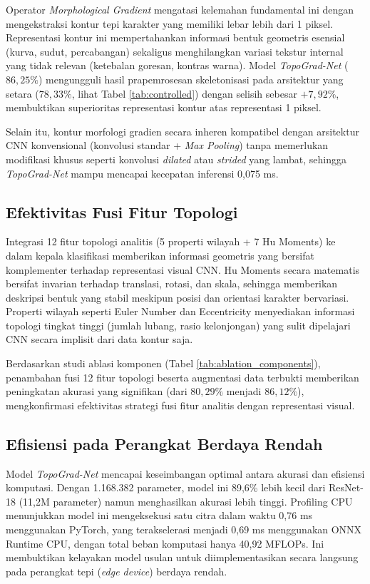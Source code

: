 \documentclass[journal]{IEEEtran}
\begin{document}
Operator \textit{Morphological Gradient} mengatasi kelemahan fundamental ini dengan mengekstraksi kontur tepi karakter yang memiliki lebar lebih dari 1 piksel. Representasi kontur ini mempertahankan informasi bentuk geometris esensial (kurva, sudut, percabangan) sekaligus menghilangkan variasi tekstur internal yang tidak relevan (ketebalan goresan, kontras warna). Model \textit{TopoGrad-Net} ($86{,}25\%$) mengungguli hasil prapemrosesan skeletonisasi pada arsitektur yang setara ($78{,}33\%$, lihat Tabel \ref{tab:controlled}) dengan selisih sebesar $+7{,}92\%$, membuktikan superioritas representasi kontur atas representasi 1 piksel.

Selain itu, kontur morfologi gradien secara inheren kompatibel dengan arsitektur CNN konvensional (konvolusi standar + \textit{Max Pooling}) tanpa memerlukan modifikasi khusus seperti konvolusi \textit{dilated} atau \textit{strided} yang lambat, sehingga \textit{TopoGrad-Net} mampu mencapai kecepatan inferensi 0,075 ms.

\subsection{Efektivitas Fusi Fitur Topologi}
Integrasi 12 fitur topologi analitis (5 properti wilayah + 7 Hu Moments) ke dalam kepala klasifikasi memberikan informasi geometris yang bersifat komplementer terhadap representasi visual CNN. Hu Moments \cite{hu1962visual} secara matematis bersifat invarian terhadap translasi, rotasi, dan skala, sehingga memberikan deskripsi bentuk yang stabil meskipun posisi dan orientasi karakter bervariasi. Properti wilayah seperti Euler Number dan Eccentricity menyediakan informasi topologi tingkat tinggi (jumlah lubang, rasio kelonjongan) yang sulit dipelajari CNN secara implisit dari data kontur saja.

Berdasarkan studi ablasi komponen (Tabel \ref{tab:ablation_components}), penambahan fusi 12 fitur topologi beserta augmentasi data terbukti memberikan peningkatan akurasi yang signifikan (dari $80{,}29\%$ menjadi $86{,}12\%$), mengkonfirmasi efektivitas strategi fusi fitur analitis dengan representasi visual.

\subsection{Efisiensi pada Perangkat Berdaya Rendah}
Model \textit{TopoGrad-Net} mencapai keseimbangan optimal antara akurasi dan efisiensi komputasi. Dengan 1.168.382 parameter, model ini 89,6\% lebih kecil dari ResNet-18 (11,2M parameter) namun menghasilkan akurasi lebih tinggi. Profiling CPU menunjukkan model ini mengeksekusi satu citra dalam waktu 0,76 ms menggunakan PyTorch, yang terakselerasi menjadi 0,69 ms menggunakan ONNX Runtime CPU, dengan total beban komputasi hanya 40,92 MFLOPs. Ini membuktikan kelayakan model usulan untuk diimplementasikan secara langsung pada perangkat tepi (\textit{edge device}) berdaya rendah.
\end{document}
